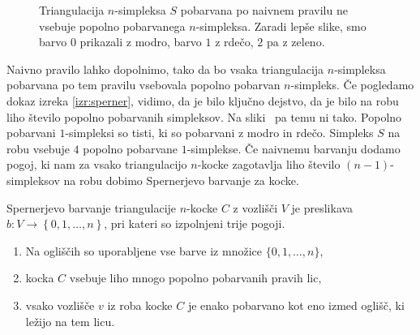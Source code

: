 \documentclass[mat1]{fmfdelo}
\newcommand{\0}{\underline{0}}
\begin{document}
\begin{figure}[h!]
	\centering
	\caption{Triangulacija $n$-simpleksa $S$ pobarvana po naivnem pravilu ne vsebuje popolno pobarvanega $n$-simpleksa. Zaradi lepše slike, smo barvo $0$ prikazali z modro, barvo $1$ z rdečo, $2$ pa z zeleno.}\label{fig:ni-pop}
\end{figure}
Naivno pravilo lahko dopolnimo, tako da bo vsaka triangulacija $n$-simpleksa pobarvana po tem pravilu vsebovala popolno pobarvan $n$-simpleks. Če pogledamo dokaz izreka \ref{izr:sperner}, vidimo, da je bilo ključno dejstvo, da je bilo na robu liho število popolno pobarvanih simpleksov. Na sliki~\label{fig:ni-pop} pa temu ni tako. Popolno pobarvani $1$-simpleksi so tisti, ki so pobarvani z modro in rdečo. Simpleks $S$ na robu vsebuje $4$ popolno pobarvane $1$-simplekse. Če naivnemu barvanju dodamo pogoj, ki nam za vsako triangulacijo $n$-kocke zagotavlja liho število $(n-1)$-simpleksov na robu dobimo Spernerjevo barvanje za kocke.
\begin{definicija}\label{def:cubsperner}
Spernerjevo barvanje triangulacije $n$-kocke $C$ z vozlišči $V$ je preslikava $b : V \to \left \{ 0, 1, \dots, n \right \}$, pri kateri so izpolnjeni trije pogoji.
\begin{enumerate}
\item Na ogliščih so uporabljene vse barve iz množice $\{ 0, 1, \dots, n \}$,
\item kocka $C$ vsebuje liho mnogo popolno pobarvanih pravih lic,
\item vsako vozlišče $v$ iz roba kocke $C$ je enako pobarvano kot eno izmed oglišč, ki ležijo na tem licu.
\end{enumerate}
\end{definicija}
\end{document}
